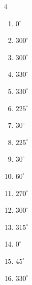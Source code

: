 \begin{multicols}{4}
\begin{enumerate}
  \item $\displaystyle 0^{\circ}$
        \phantom{$\displaystyle =0$}

  \item $\displaystyle 300^{\circ}$

\columnbreak %

\resetques

  \item $\displaystyle 300^{\circ}$

  \item $\displaystyle 330^{\circ}$

  \item $\displaystyle 330^{\circ}$

  \item $\displaystyle 225^{\circ}$

  \item $\displaystyle 30^{\circ}$

  \item $\displaystyle 225^{\circ}$

  \item $\displaystyle 30^{\circ}$

  \item $\displaystyle 60^{\circ}$

  \item $\displaystyle 270^{\circ}$

  \item $\displaystyle 300^{\circ}$

  \item $\displaystyle 315^{\circ}$

  \item $\displaystyle 0^{\circ}$
        \phantom{$\displaystyle =0$}

  \item $\displaystyle 45^{\circ}$

  \item $\displaystyle 330^{\circ}$


\end{enumerate}
\end{multicols}
